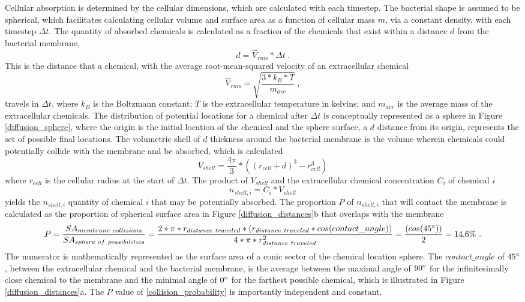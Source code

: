 \begin{supplementary}
Cellular absorption is determined by the cellular dimensions, which are calculated with each timestep. The bacterial shape is assumed to be spherical, which facilitates calculating cellular volume and surface area as a function of cellular mass $m$, via a constant density, with each timestep $\Delta t$. The quantity of absorbed chemicals is calculated as a fraction of the chemicals that exist within a distance $d$ from the bacterial membrane,
\begin{equation}
    d=\overset{\rightharpoonup}{V}_{rms}*\Delta t~.
\end{equation} 
This is the distance that a chemical, with the average root-mean-squared velocity of an extracellular chemical
\begin{equation}
    \overset{\rightharpoonup}{V}_{rms}=\sqrt{\frac{3*k_B*T}{m_{ave}}}~,
\end{equation} 		
travels in $\Delta t$, where $k_B$ is the Boltzmann constant; $T$ is the extracellular temperature in kelvins; and $m_{ave}$ is the average mass of the extracellular chemicals. The distribution of potential locations for a chemical after $\Delta t$ is conceptually represented as a sphere in Figure \ref{diffusion_sphere}, where the origin is the initial location of the chemical and the sphere surface, a $d$ distance from its origin, represents the set of possible final locations. The volumetric shell of $d$ thickness around the bacterial membrane is the volume wherein chemicals could potentially collide with the membrane and be absorbed, which is calculated
\begin{equation} \label{shell_volume}
    V_{shell}=\frac{4\pi}{3}*((r_{cell}+d)^3-r_{cell}^3)
\end{equation}
where $r_{cell}$ is the cellular radius at the start of $\Delta t$. The product of $V_{shell}$ and the extracellular chemical concentration $C_i$ of chemical $i$ 
\begin{equation} \label{shell_quantity}
    n_{shell,i}=C_i*V_{shell}
\end{equation}
yields the $n_{shell,i}$ quantity of chemical $i$ that may be potentially absorbed. The proportion $P$ of $n_{shell,i}$ that will contact the membrane is calculated as the proportion of spherical surface area in Figure \ref{diffusion_distances}b that overlaps with the membrane
\begin{equation} \label{collision_probability}
    P = \frac{SA_{membrane~collisions}}{SA_{sphere~of~possibilities}} = \frac{
    2*\pi*r_{distance~traveled}*(r_{distance~traveled}*cos(contact\_angle))
    }{
    4*\pi*r_{distance~traveled}^2
    } = \frac{(cos(45\degree))}{2} = 14.6\%~.
\end{equation}
The numerator is mathematically represented as the surface area of a conic sector of the chemical location sphere. The $contact\_angle$ of $45\degree$, between the extracellular chemical and the bacterial membrane, is the average between the maximal angle of $90\degree$ for the infinitesimally close chemical to the membrane and the minimal angle of $0\degree$ for the farthest possible chemical, which is illustrated in Figure \ref{diffusion_distances}a. The $P$ value of \cref{collision_probability} is importantly independent and constant. 


\end{supplementary}
